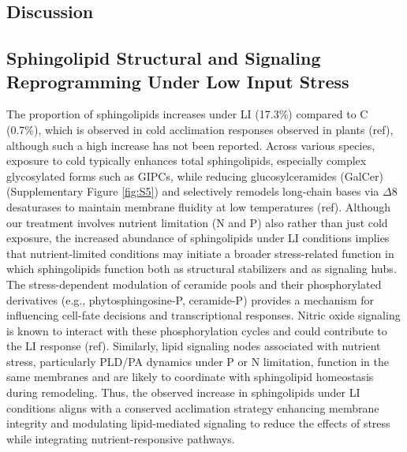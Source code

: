 \documentclass[10pt,letterpaper]{article}
\begin{document}
\begin{itemize}



\section*{Discussion}

\subsection*{Sphingolipid Structural and Signaling Reprogramming Under Low Input Stress}
The proportion of sphingolipids increases under LI (17.3\%) compared to C (0.7\%), which is observed in cold acclimation responses observed in plants (ref), although such a high increase has not been reported. Across various species, exposure to cold typically enhances total sphingolipids, especially complex glycosylated forms such as GIPCs, while reducing glucosylceramides (GalCer) (Supplementary Figure \ref{fig:S5}) and selectively remodels long-chain bases via $\Delta$8 desaturases to maintain membrane fluidity at low temperatures  (ref). Although our treatment involves nutrient limitation (N and P) also rather than just cold exposure, the increased abundance of sphingolipids under LI conditions implies that nutrient-limited conditions may initiate a broader stress-related function in which sphingolipids function both as structural stabilizers and as signaling hubs. The stress-dependent modulation of ceramide pools and their phosphorylated derivatives (e.g., phytosphingosine-P, ceramide-P) provides a mechanism for influencing cell-fate decisions and transcriptional responses. Nitric oxide signaling is known to interact with these phosphorylation cycles and could contribute to the LI response (ref). Similarly, lipid signaling nodes associated with nutrient stress, particularly PLD/PA dynamics under P or N limitation, function in the same membranes and are likely to coordinate with sphingolipid homeostasis during remodeling. Thus, the observed increase in sphingolipids under LI conditions aligns with a conserved acclimation strategy enhancing membrane integrity and modulating lipid-mediated signaling to reduce the effects of stress while integrating nutrient-responsive pathways. 


\end{itemize}
\end{document}
